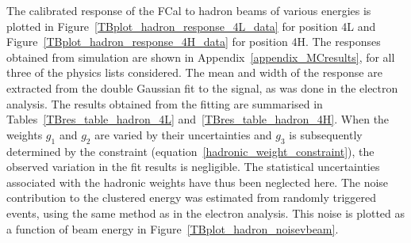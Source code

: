 The calibrated response of the FCal to hadron beams of various energies is plotted in Figure~\ref{TBplot_hadron_response_4L_data} for position 4L and Figure~\ref{TBplot_hadron_response_4H_data} for position 4H. The responses obtained from simulation  are shown in Appendix~\ref{appendix_MCresults}, for all three of the physics lists considered. The mean and width of the response are extracted from the double Gaussian fit to the signal, as was done in the electron analysis. The results obtained from the fitting are summarised in Tables~\ref{TBres_table_hadron_4L} and~\ref{TBres_table_hadron_4H}. When the weights $g_1$ and $g_2$ are varied by their uncertainties and $g_3$ is subsequently determined by the constraint (equation~\ref{hadronic_weight_constraint}), the observed variation in the fit results is negligible. The statistical uncertainties associated with the hadronic weights have thus been neglected here. The noise contribution to the clustered energy was estimated from randomly triggered events, using the same method as in the electron analysis. This noise is plotted as a function of beam energy in Figure~\ref{TBplot_hadron_noisevbeam}.

